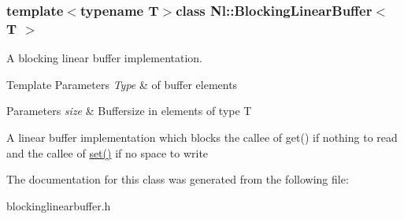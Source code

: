 \subsubsection*{template$<$typename T$>$class Nl\+::\+Blocking\+Linear\+Buffer$<$ T $>$}

A blocking linear buffer implementation. 


\begin{DoxyTemplParams}{Template Parameters}
{\em Type} & of buffer elements \\
\hline
\end{DoxyTemplParams}

\begin{DoxyParams}{Parameters}
{\em size} & Buffersize in elements of type T\\
\hline
\end{DoxyParams}
A linear buffer implementation which blocks the callee of get() if nothing to read and the callee of \hyperlink{group__Audio_gacd7c49cb333fc991edae3247d2fb34ef}{set()} if no space to write 

The documentation for this class was generated from the following file\+:\begin{DoxyCompactItemize}
\item 
blockinglinearbuffer.\+h\end{DoxyCompactItemize}
